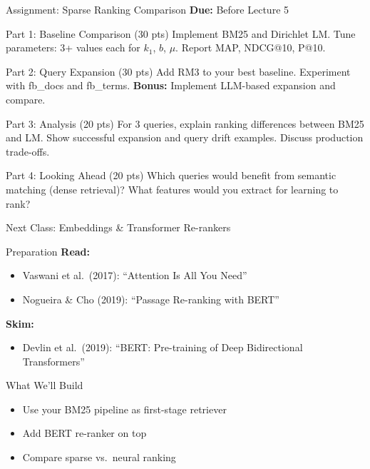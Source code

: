 \documentclass[aspectratio=169]{beamer}
\begin{document}
\begin{frame}{Assignment: Sparse Ranking Comparison}
\textbf{Due:} Before Lecture 5

\vspace{0.5em}

\begin{block}{Part 1: Baseline Comparison (30 pts)}
Implement BM25 and Dirichlet LM. Tune parameters: 3+ values each for $k_1$, $b$, $\mu$. Report MAP, NDCG@10, P@10.
\end{block}

\begin{block}{Part 2: Query Expansion (30 pts)}
Add RM3 to your best baseline. Experiment with fb\_docs and fb\_terms. \textbf{Bonus:} Implement LLM-based expansion and compare.
\end{block}

\begin{block}{Part 3: Analysis (20 pts)}
For 3 queries, explain ranking differences between BM25 and LM. Show successful expansion and query drift examples. Discuss production trade-offs.
\end{block}

\begin{block}{Part 4: Looking Ahead (20 pts)}
Which queries would benefit from semantic matching (dense retrieval)? What features would you extract for learning to rank?
\end{block}
\end{frame}

\begin{frame}{Next Class: Embeddings \& Transformer Re-rankers}
\begin{block}{Preparation}
\textbf{Read:}
\begin{itemize}
    \item Vaswani et al.\ (2017): ``Attention Is All You Need''
    \item Nogueira \& Cho (2019): ``Passage Re-ranking with BERT''
\end{itemize}

\textbf{Skim:}
\begin{itemize}
    \item Devlin et al.\ (2019): ``BERT: Pre-training of Deep Bidirectional Transformers''
\end{itemize}
\end{block}

\vspace{0.5em}

\begin{exampleblock}{What We'll Build}
\begin{itemize}
    \item Use your BM25 pipeline as first-stage retriever
    \item Add BERT re-ranker on top
    \item Compare sparse vs.\ neural ranking
\end{itemize}
\end{exampleblock}
\end{frame}
\end{document}
